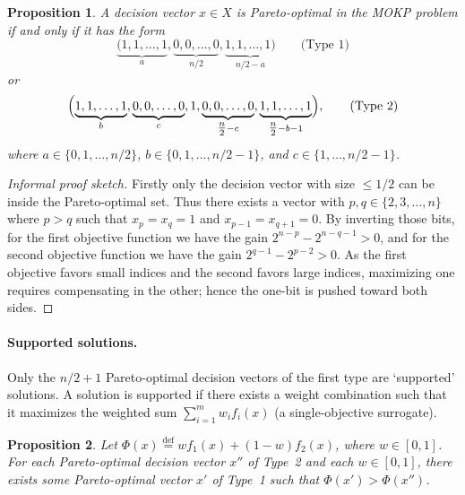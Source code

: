 \documentclass[a4paper, 11pt]{report}
\newtheorem{proposition}{Proposition}
\theoremstyle{remark}
\begin{document}
\begin{proposition}\label{prop:type-forms}
A decision vector $x\in X$ is Pareto-optimal in the MOKP problem if and only if it has the form
\[
\underbrace{(1,1,\ldots,1}_{a},
\underbrace{0,0,\ldots,0}_{n/2},
\underbrace{1,1,\ldots,1)}_{n/2-a}
\qquad\text{(Type 1)}
\]
or
\[
\Bigl(
\underbrace{1,1,\ldots,1}_{b},
\underbrace{0,0,\ldots,0}_{c},
1,
\underbrace{0,0,\ldots,0}_{\tfrac{n}{2}-c},
\underbrace{1,1,\ldots,1}_{\tfrac{n}{2}-b-1}
\Bigr),\qquad\text{(Type 2)}
\]
where $a\in\{0,1,\ldots,n/2\}$, $b\in\{0,1,\ldots,n/2-1\}$, and $c\in\{1,\ldots,n/2-1\}$.
\end{proposition}

\begin{proof}[Informal proof sketch]
Firstly only the decision vector with size $\leq 1/2$ can be inside the Pareto-optimal set. Thus there exists a vector with 
$p,q\in\{2,3,\ldots,n\}$ where $p>q$ such that $x_p=x_q=1$ and $x_{p-1}=x_{q+1}=0$. By inverting those bits, for the first objective function we have the gain 
$2^{n-p}-2^{n-q-1}>0$, and for the second objective function we have the gain $2^{q-1}-2^{p-2}>0$. As the first objective favors small indices and the second 
favors large indices, maximizing one requires compensating in the other; hence the one-bit is pushed toward both sides.
\end{proof}

\paragraph{Supported solutions.}
Only the $n/2+1$ Pareto-optimal decision vectors of the first type are `supported' solutions. A solution is supported if there exists a weight 
combination such that it maximizes the weighted sum $\sum_{i=1}^{m}w_i f_i(x)$ (a single-objective surrogate).

\begin{proposition}\label{prop:supported}
Let $\Phi(x)\overset{\text{def}}{=}w f_1(x)+(1-w)f_2(x)$, where $w\in[0,1]$. 
For each Pareto-optimal decision vector $x''$ of Type~2 and each $w\in[0,1]$, there exists some Pareto-optimal vector $x'$ of Type~1 such that 
$\Phi(x')>\Phi(x'')$.
\end{proposition}
\end{document}
